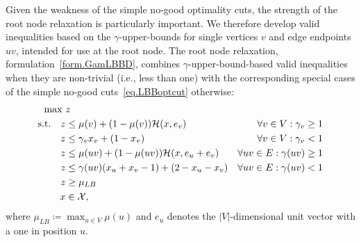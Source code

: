Given the weakness of the simple no-good optimality cuts, the strength
of the root node relaxation is particularly important. We therefore
develop valid inequalities based on the $\gamma$-upper-bounds for
single vertices $v$ and edge endpoints $uv$, intended for use at the
root node. The root node relaxation,
formulation~\eqref{form.GamLBBD}, combines $\gamma$-upper-bound-based
valid inequalities when they are non-trivial (i.e., less than one)
with the corresponding special cases of the simple no-good
cuts~\eqref{eq.LBBoptcut} otherwise:
\begin{subequations}\label{form.GamLBBD}
\begin{align}
  \max\ & z \\
  \text{s.t.}\quad
  \label{eq.single} z &\le \mu(v) + (1 - \mu(v)) \mathcal{H}(x,
  e_v) & \forall v \in V : \gamma_v \ge 1 \\
  z &\le \gamma_v x_v + (1 - x_v) & \forall v \in V :
  \gamma_v < 1 \\
  z &\le \mu(uv) + (1 - \mu(uv)) \mathcal{H}(x, e_u + e_v) &
  \forall uv \in E : \gamma(uv) \ge 1 \\
  \label{eq.pair} z &\le \gamma(uv)(x_u + x_v - 1) +
  (2 - x_u - x_v) & \forall uv \in E : \gamma(uv) < 1 \\
  \label{eq.zmuLB} z &\ge \mu_{LB} \\
  x &\in \mathcal{X},
\end{align}
\end{subequations}
where $\mu_{LB} \coloneqq \max_{u \in V} \mu(u)$ and $e_u$ denotes
the $|V|$-dimensional unit vector with a one in position $u$.

\begin{algorithm}[htbp]
\caption{Logic-Based Benders Decomposition: Separation Procedure}
\label{alg.LBBDgamma}
\end{algorithm}

